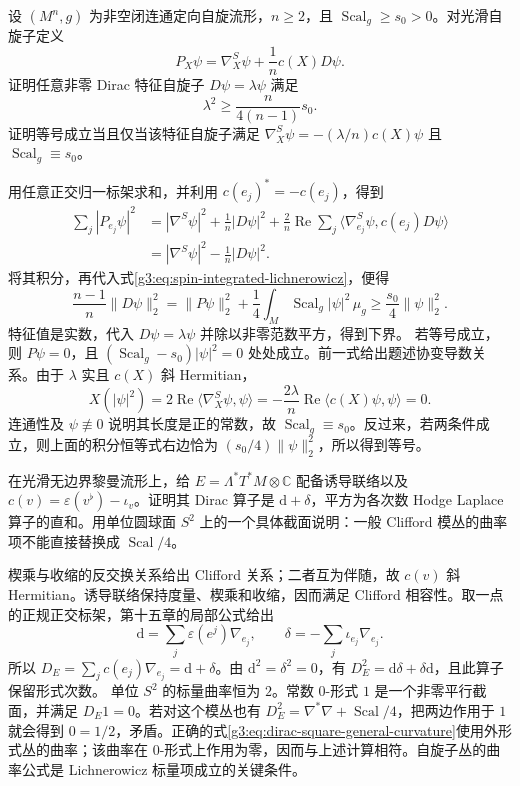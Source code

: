 \begin{optionalexercise}\label{g3:ex:spin-sharper-eigenvalue-bound}
	设 \((M^n,g)\) 为非空闭连通定向自旋流形，\(n\ge2\)，且 \(\operatorname{Scal}_g\ge s_0>0\)。对光滑自旋子定义
	\[
		P_X\psi=\nabla^S_X\psi+\frac1n c(X)D\psi.
	\]
	证明任意非零 Dirac 特征自旋子 \(D\psi=\lambda\psi\) 满足
	\[
		\lambda^2\ge\frac{n}{4(n-1)}s_0.
	\]
	证明等号成立当且仅当该特征自旋子满足 \(\nabla^S_X\psi=-(\lambda/n)c(X)\psi\) 且 \(\operatorname{Scal}_g\equiv s_0\)。
\end{optionalexercise}
\begin{solution}
	用任意正交归一标架求和，并利用 \(c(e_j)^*=-c(e_j)\)，得到
	\begin{align*}
		\sum_j|P_{e_j}\psi|^2
		&=|\nabla^S\psi|^2+\frac1n|D\psi|^2
		+\frac2n\operatorname{Re}\sum_j\langle\nabla^S_{e_j}\psi,c(e_j)D\psi\rangle\\
		&=|\nabla^S\psi|^2-\frac1n|D\psi|^2.
	\end{align*}
	将其积分，再代入式\eqref{g3:eq:spin-integrated-lichnerowicz}，便得
	\[
		\frac{n-1}{n}\|D\psi\|_2^2
		=\|P\psi\|_2^2+\frac14\int_M\operatorname{Scal}_g|\psi|^2\,\mu_g
		\ge\frac{s_0}{4}\|\psi\|_2^2.
	\]
	特征值是实数，代入 \(D\psi=\lambda\psi\) 并除以非零范数平方，得到下界。
	若等号成立，则 \(P\psi=0\)，且 \((\operatorname{Scal}_g-s_0)|\psi|^2=0\) 处处成立。前一式给出题述协变导数关系。由于 \(\lambda\) 实且 \(c(X)\) 斜 Hermitian，
	\[
		 X(|\psi|^2)=2\operatorname{Re}\langle\nabla^S_X\psi,\psi\rangle
		=-\frac{2\lambda}{n}\operatorname{Re}\langle c(X)\psi,\psi\rangle=0.
	\]
	连通性及 \(\psi\not\equiv0\) 说明其长度是正的常数，故 \(\operatorname{Scal}_g\equiv s_0\)。反过来，若两条件成立，则上面的积分恒等式右边恰为 \((s_0/4)\|\psi\|_2^2\)，所以得到等号。
\end{solution}

\begin{optionalexercise}\label{g3:ex:forms-dirac-not-spin-dirac}
	在光滑无边界黎曼流形上，给 \(E=\Lambda^*T^*M\otimes\mathbb C\) 配备诱导联络以及 \(c(v)=\varepsilon(v^\flat)-\iota_v\)。证明其 Dirac 算子是 \(\mathrm d+\delta\)，平方为各次数 Hodge Laplace 算子的直和。用单位圆球面 \(S^2\) 上的一个具体截面说明：一般 Clifford 模丛的曲率项不能直接替换成 \(\operatorname{Scal}/4\)。
\end{optionalexercise}
\begin{solution}
	楔乘与收缩的反交换关系给出 Clifford 关系；二者互为伴随，故 \(c(v)\) 斜 Hermitian。诱导联络保持度量、楔乘和收缩，因而满足 Clifford 相容性。取一点的正规正交标架，第十五章的局部公式给出
	\[
		\mathrm d=\sum_j\varepsilon(e^j)\nabla_{e_j},\qquad
		\delta=-\sum_j\iota_{e_j}\nabla_{e_j}.
	\]
	所以 \(D_E=\sum_jc(e_j)\nabla_{e_j}=\mathrm d+\delta\)。由 \(\mathrm d^2=\delta^2=0\)，有 \(D_E^2=\mathrm d\delta+\delta\mathrm d\)，且此算子保留形式次数。
	单位 \(S^2\) 的标量曲率恒为 \(2\)。常数 \(0\)-形式 \(1\) 是一个非零平行截面，并满足 \(D_E1=0\)。若对这个模丛也有 \(D_E^2=\nabla^*\nabla+\operatorname{Scal}/4\)，把两边作用于 \(1\) 就会得到 \(0=1/2\)，矛盾。正确的式\eqref{g3:eq:dirac-square-general-curvature}使用外形式丛的曲率；该曲率在 \(0\)-形式上作用为零，因而与上述计算相符。自旋子丛的曲率公式是 Lichnerowicz 标量项成立的关键条件。
\end{solution}

